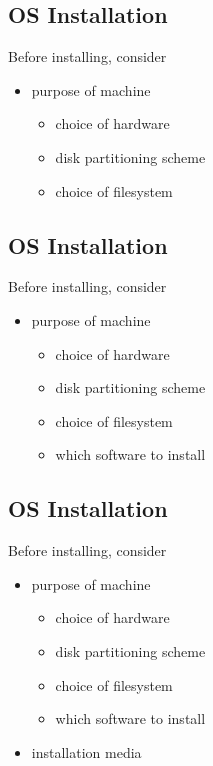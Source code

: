 \documentclass[xga]{xdvislides}
\begin{document}
\subsection{OS Installation}
Before installing, consider
\begin{itemize}
	\item purpose of machine
		\begin{itemize}
			\item choice of hardware
			\item disk partitioning scheme
			\item choice of filesystem
		\end{itemize}
\end{itemize}

\subsection{OS Installation}
Before installing, consider
\begin{itemize}
	\item purpose of machine
		\begin{itemize}
			\item choice of hardware
			\item disk partitioning scheme
			\item choice of filesystem
			\item which software to install
		\end{itemize}
\end{itemize}

\subsection{OS Installation}
Before installing, consider
\begin{itemize}
	\item purpose of machine
		\begin{itemize}
			\item choice of hardware
			\item disk partitioning scheme
			\item choice of filesystem
			\item which software to install
		\end{itemize}
	\item installation media
\end{itemize}
\end{document}
